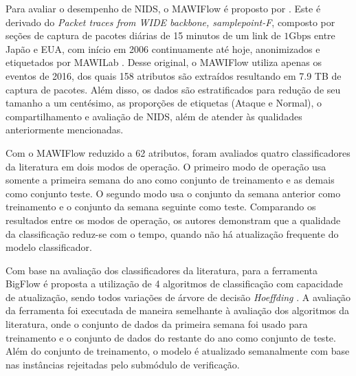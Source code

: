 Para avaliar o desempenho de NIDS, o \dataset MAWIFlow é proposto por .
Este \dataset é derivado do
\dataset \emph{Packet traces from WIDE backbone, samplepoint-F}, composto por
seções de captura de pacotes diárias de 15 minutos de um link de $1
\mathrm{Gbps}$ entre Japão e EUA, com início em 2006 continuamente até hoje,
anonimizados e etiquetados por MAWILab \cite{mawiSamplepointF,Fontugne2010}.
Desse \dataset original, o \dataset MAWIFlow utiliza apenas os eventos de 2016,
dos quais 158 atributos são extraídos resultando em 7.9 TB de captura de pacotes.
Além disso, os dados são estratificados para redução de seu tamanho a um
centésimo,  as proporções de etiquetas (Ataque e Normal),  o
compartilhamento e avaliação de NIDS, além de atender às qualidades anteriormente
mencionadas.


Com o \dataset MAWIFlow reduzido a 62 atributos, foram avaliados quatro
classificadores da literatura em dois modos de operação.
O primeiro modo de operação usa somente a primeira semana do ano como conjunto
de treinamento e as demais como conjunto teste.
O segundo modo usa o conjunto da semana anterior como treinamento e o
conjunto da semana seguinte como teste.
Comparando os resultados entre os modos de operação, os autores demonstram que a qualidade da
classificação reduz-se com o tempo, quando não há atualização frequente do modelo
classificador.

Com base na avaliação dos classificadores da literatura, para a ferramenta
BigFlow é proposta a utilização de 4 algoritmos de classificação com capacidade
de atualização, sendo todos variações de árvore de decisão
\emph{Hoeffding} \cite{Viegas2019,Domingos2000}.
A avaliação da ferramenta foi executada de maneira semelhante à avaliação
dos algoritmos da literatura, onde o conjunto de dados da primeira semana foi
usado para treinamento e o conjunto de dados do restante do ano como conjunto
de teste.
Além do conjunto de treinamento, o modelo é atualizado semanalmente com base nas
instâncias rejeitadas pelo submódulo de verificação.

